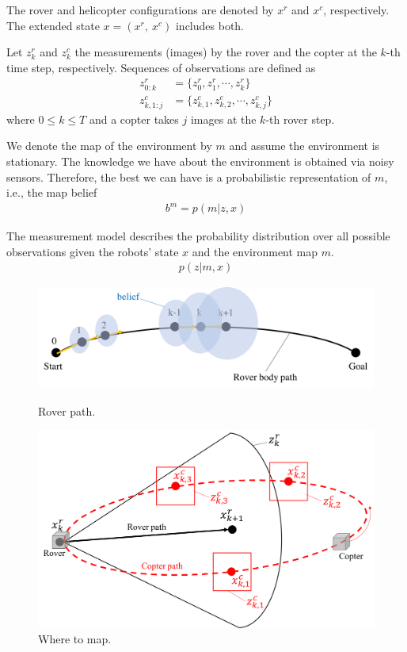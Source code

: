 \documentclass[conference]{IEEEtran}
\begin{document}
The rover and helicopter configurations are denoted by $x^r$ and $x^c$, respectively. The extended state $x=(x^r,~x^c)$ includes both.

Let $z^r_k$ and $z^c_k$ the measurements (images) by the rover and the copter at the $k$-th time step, respectively. Sequences of observations are defined as
\begin{align}
    z^r_{0:k}&=\{z^r_0,z^r_1,\cdots,z^r_k\}\\
    z^c_{k,1:j}&=\{z^c_{k,1},z^c_{k,2},\cdots,z^c_{k,j}\}
\end{align}
where $0 \leq k \leq T$ and a copter takes $j$ images at the $k$-th rover step.

We denote the map of the environment by $m$ and assume the environment is stationary. The knowledge we have about the environment is obtained via noisy sensors. Therefore, the best we can have is a probabilistic representation of $m$, i.e., the map belief
\begin{align}
    b^m=p(m|z, x)
\end{align}

The measurement model describes the probability distribution over all possible observations given the robots' state $x$ and the environment map $m$.
\begin{align}
    p(z|m, x)
\end{align}



\begin{figure}[h]
		\centering
		\includegraphics[width=1.0\columnwidth]{figs/8_1.png}
		\caption{Rover path.}
		\label{fig:8_1}
		\centering
		\includegraphics[width=1.0\columnwidth]{figs/8_2.png}
		\caption{Where to map.}
		\label{fig:8_2}
\end{figure}
\end{document}
